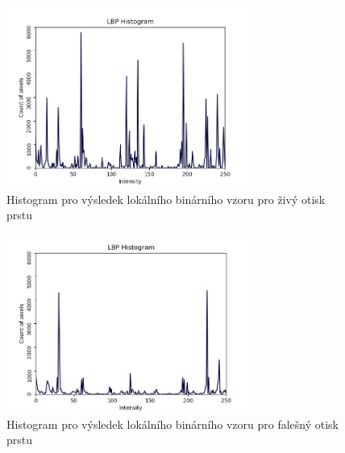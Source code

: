 \begin{figure}[htbp]
    \centering
    \includegraphics[width=300]{obrazky-figures/histogramlive.png}
    \caption{Histogram pro výsledek lokálního binárního vzoru pro živý otisk prstu}
    \label{fig:lbphistlive}
\end{figure}






\begin{figure}[htbp]
    \centering
    \includegraphics[width=300]{obrazky-figures/histfake.png}
    \caption{Histogram pro výsledek lokálního binárního vzoru pro falešný otisk prstu}
    \label{fig:lbphistfake}
\end{figure}








